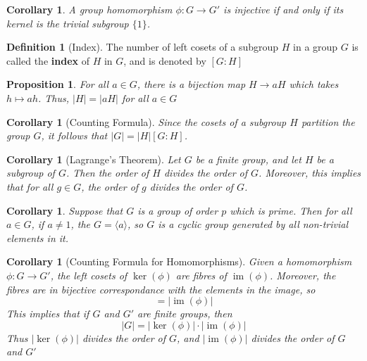\documentclass[12pt]{article}
\newtheorem{cor}[thm]{Corollary}
\newtheorem{prop}[thm]{Proposition}
\theoremstyle{definition}
\newtheorem{defn}[thm]{Definition}
\theoremstyle{remark}
\numberwithin{equation}{section}
\newcommand\B[1]{\textbf{ #1}}
\DeclareMathOperator{\im}{im}
\begin{document}
\begin{cor}
        A group homomorphism $\phi:G\rightarrow G'$ is injective if and only if its kernel is the trivial subgroup $\{1\}$.
\end{cor}


\vspace{15pt}

\begin{defn}[Index]
        The number of left cosets of a subgroup $H$ in a group $G$ is called the \B{index} of $H$ in $G$, and is denoted by $[G:H]$
\end{defn}

\vspace{15pt}

\begin{prop}
        For all $a\in G$, there is a bijection map $H\rightarrow aH$ which takes $h\mapsto ah$. Thus, $|H| = |aH|$ for all $a \in G$
\end{prop}

\vspace{15pt}


\begin{cor}[Counting Formula]
        Since the cosets of a subgroup $H$ partition the group $G$, it follows that $|G| = |H|[G:H]$.
\end{cor}


\vspace{15pt}

\begin{cor}[Lagrange's Theorem]
        Let $G$ be a finite group, and let $H$ be a subgroup of $G$. Then the order of $H$ divides the order of $G$. Moreover, this implies that for all $g \in G$, the order of $g$ divides the order of $G$.
\end{cor}


\vspace{15pt}


\begin{cor}
        Suppose that $G$ is a group of order $p$ which is prime. Then for all $a\in G$, if $a \neq 1$, the $G = \langle a \rangle$, so $G$ is a cyclic group generated by all non-trivial elements in it.
\end{cor}

\vspace{15pt}

\begin{cor}[Counting Formula for Homomorphisms]
        Given a homomorphism $\phi:G\rightarrow G'$, the left cosets of $\ker(\phi)$ are fibres of $\im(\phi)$. Moreover, the fibres are in bijective correspondance with the elements in the image, so \begin{equation}
                [G:\ker(\phi)] = |\im(\phi)|
        \end{equation}
        This implies that if $G$ and $G'$ are finite groups, then \begin{equation}
                |G| = |\ker(\phi)|\cdot|\im(\phi)|
        \end{equation}
        Thus $|\ker(\phi)|$ divides the order of $G$, and $|\im(\phi)|$ divides the order of $G$ and $G'$
\end{cor}
\end{document}
